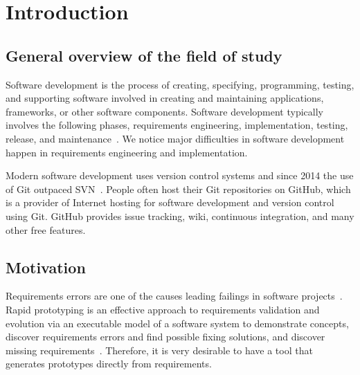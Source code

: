 \chapter{Introduction}



\section{General overview of the field of study}
Software development is the process of creating, specifying, programming, testing, and supporting software involved in creating and maintaining applications, frameworks, or other software components.
Software development typically involves the following phases, requirements engineering, implementation, testing, release, and maintenance~\cite{petersen2009waterfall}. We notice major difficulties in software development happen in requirements engineering and implementation.

Modern software development uses version control systems and since 2014 the use of Git outpaced SVN~\cite{says_eclipse_2014}. People often host their Git repositories on GitHub, which is a provider of Internet hosting for software development and version control using Git. GitHub provides issue tracking, wiki, continuous integration, and many other free features.

\section{Motivation}

Requirements errors are one of the causes leading failings in software projects~\cite{sutcliffe1999tracing}.
Rapid prototyping is an effective approach to requirements validation and evolution via an executable model of a software system to demonstrate concepts, discover requirements errors and find possible fixing solutions, and discover missing requirements~\cite{kordon2002introduction}.
Therefore, it is very desirable to have a tool that generates prototypes directly from requirements.

